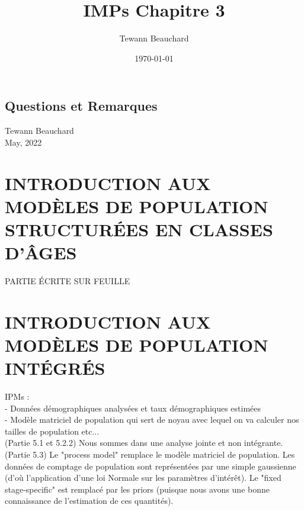 \documentclass[12pt,a4paper]{article}
\title{IMPs Chapitre 3}
\date{\today}
\author{Tewann Beauchard}
\begin{document}
\begin{center}
\section*{Questions et Remarques}
\vspace*{1cm}
Tewann Beauchard \\
\vspace*{1cm}
May, 2022
\end{center}
\vspace*{1cm}



\section{INTRODUCTION AUX MODÈLES DE POPULATION STRUCTURÉES EN CLASSES D'ÂGES}
PARTIE ÉCRITE SUR FEUILLE

\section{INTRODUCTION AUX MODÈLES DE POPULATION INTÉGRÉS}
IPMs :\\ - Données démographiques analysées et taux démographiques estimées\\
- Modèle matriciel de population qui sert de noyau avec lequel on va calculer nos tailles de population etc...\\
(Partie 5.1 et 5.2.2) Nous sommes dans une analyse jointe et non intégrante.\\
(Partie 5.3) Le "process model" remplace le modèle matriciel de population. Les données de comptage de population sont représentées par une simple gaussienne (d'où l'application d'une loi Normale sur les paramètres d'intérêt). Le "fixed stage-specific" est remplacé par les priors (puisque nous avons une bonne connaissance de l’estimation de ces quantités).\\
\end{document}
